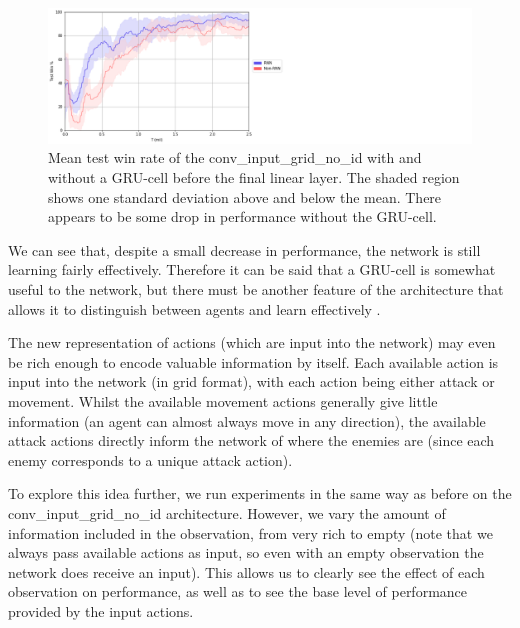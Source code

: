 \begin{figure}
    \centering
    \hbox{\hspace{5em}\includegraphics[scale=0.5]{images/graphs/rnn.png}}
    \caption{Mean test win rate of the conv\_input\_grid\_no\_id with and without a GRU-cell before the final linear layer. The shaded region shows one standard deviation above and below the mean. There appears to be some drop in performance without the GRU-cell.}
    \label{fig:rnnvsnonrnn}
\end{figure}


We can see that, despite a small decrease in performance, the network is still learning fairly effectively. Therefore it can be said that a GRU-cell is somewhat useful to the network, but there must be another feature of the architecture that allows it to distinguish between agents and learn effectively . 

The new representation of actions (which are input into the network) may even be rich enough to encode valuable information by itself. Each available action is input into the network (in grid format), with each action being either attack or movement. Whilst the available movement actions generally give little information (an agent can almost always move in any direction), the available attack actions directly inform the network of where the enemies are (since each enemy corresponds to a unique attack action).


To explore this idea further, we run experiments in the same way as before on the conv\_input\_grid\_no\_id architecture. However, we vary the amount of information included in the observation, from very rich to empty (note that we always pass available actions as input, so even with an empty observation the network does receive an input). This allows us to clearly see the effect of each observation on performance, as well as to see the base level of performance provided by the input actions.

